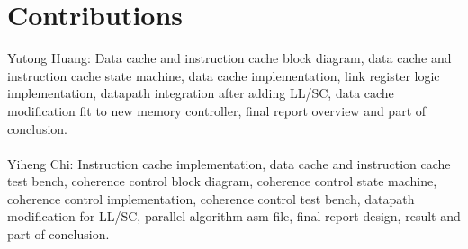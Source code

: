 \documentclass[12pt]{article}
\begin{document}
  \section{Contributions}

  Yutong Huang: Data cache and instruction cache block diagram, data cache and instruction cache state machine, data cache implementation, link register logic implementation, datapath integration after adding LL/SC, data cache modification fit to new memory controller, final report overview and part of conclusion. \\ \\
  Yiheng Chi: Instruction cache implementation, data cache and instruction cache test bench, coherence control block diagram, coherence control state machine, coherence control implementation, coherence control test bench, datapath modification for LL/SC, parallel algorithm asm file, final report design, result and part of conclusion.
\end{document}
